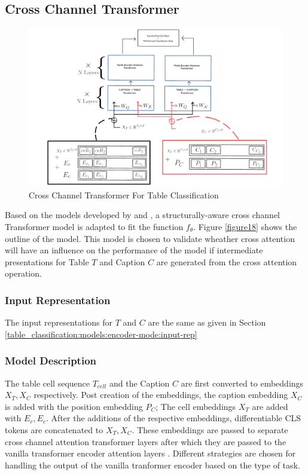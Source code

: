 \subsection{Cross Channel Transformer}
\begin{figure}[h]
    \centering
    \includegraphics[width=\maxwidth{\textwidth}]{src/images/tablemodel.pdf}
    \caption{Cross Channel Transformer For Table Classification}
    \label{figure\arabic{figurecounter}}
\end{figure}

Based on the models developed by \cite{tsai2019multimodal} and \cite{deng2020turl}, a structurally-aware cross channel Transformer model is adapted to fit the function $f_\theta$. Figure \ref{figure18} shows the outline of the model. This model is chosen to validate wheather cross attention will have an influence on the performance of the model if intermediate presentations for Table $T$ and Caption $C$ are generated from the cross attention operation. 

\subsubsection{Input Representation}
The input representations for $T$ and $C$ are the same as given in Section \ref{table_classification:models:encoder-mode:input-rep}


\subsubsection{Model Description}
The table cell sequence $T_{cell}$ and the Caption $C$ are first converted to embeddings $X_T, X_C$ respectively. Post creation of the embeddings,  the caption embedding  $X_C$ is added with the position embedding $P_C$; The cell embeddings $X_T$ are added with $E_r,E_c$. After the additions of the respective embeddings, differentiable CLS tokens are concatenated to $X_T,X_C$.
These embeddings are passed to separate cross channel attention transformer layers \parencite{tsai2019multimodal} after which they are passed to the vanilla transformer encoder attention layers \parencite{vaswani2017attention}. Different strategies are chosen for handling the output of the vanilla tranformer encoder based on the type of task. 

